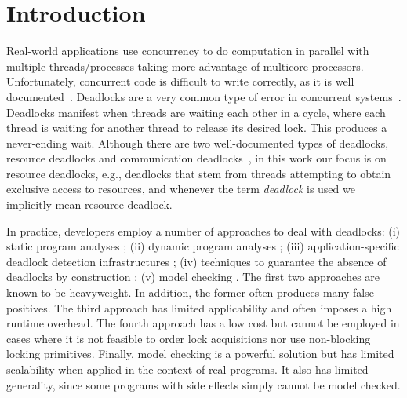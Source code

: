 \section{Introduction}

Real-world applications use concurrency to do computation in parallel with multiple threads/processes taking more advantage of multicore processors. Unfortunately, concurrent code is difficult to write correctly, as it is well documented~\cite{lu}. Deadlocks are a very common type of error in concurrent systems~\cite{lu}.
Deadlocks manifest when threads are waiting each other in a cycle, where each thread is waiting for another thread to release its desired lock. This produces a never-ending wait.
Although there are two well-documented types of deadlocks, resource deadlocks and communication deadlocks~\cite{singhal}\cite{knapp}, in this work our focus is on resource deadlocks, e.g., deadlocks that stem from threads attempting to obtain exclusive access to resources, and whenever the term \emph{deadlock} is used we implicitly mean resource deadlock.

In practice, developers employ a number of approaches to deal with deadlocks: (i) static program analyses \cite{marino}\cite{dawson}\cite{vivek}\cite{williams}; (ii) dynamic program analyses \cite{mcsdk}\cite{magicfuzzer}\cite{sammati}\cite{serenity}\cite{pyla}\cite{rx}; (iii) application-specific deadlock detection infrastructu\-res \cite{orderedlock}; (iv) techniques to guarantee the absence of deadlocks by construction \cite{marino}; (v) model checking \cite{havelund}. The first two approaches are known to be heavyweight. In addition, the former often produces many false positives. The third approach has limited applicability and often imposes a high runtime overhead. The fourth approach has a low cost but cannot be employed in cases where it is not feasible to order lock acquisitions nor use non-blocking locking primitives. Finally, model checking is a powerful solution but has limited scalability when applied in the context of real programs. It also has limited generality, since some programs with side effects simply cannot be model checked.

